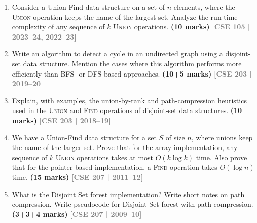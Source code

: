 \documentclass[12pt,a3paper]{article}
\newcommand{\yr}[1]{\hfill\textcolor{gray}{\small\textbf{[#1]}}}
\newcommand{\mk}[1]{\textcolor{orange!70!black}{\small\textbf{(#1 marks)}}}
\begin{document}
\begin{enumerate}

\item Consider a Union-Find data structure on a set of $n$ elements, where the \textsc{Union} operation keeps the name of the largest set. Analyze the run-time complexity of any sequence of $k$ \textsc{Union} operations. \mk{10}
\yr{CSE 105 | 2023--24, 2022--23}

\item Write an algorithm to detect a cycle in an undirected graph using a disjoint-set data structure. Mention the cases where this algorithm performs more efficiently than BFS- or DFS-based approaches. \mk{10+5}
\yr{CSE 203 | 2019--20}

\item Explain, with examples, the union-by-rank and path-compression heuristics used in the \textsc{Union} and \textsc{Find} operations of disjoint-set data structures. \mk{10}
\yr{CSE 203 | 2018--19}

\item We have a Union-Find data structure for a set $S$ of size $n$, where unions keep the name of the larger set. Prove that for the array implementation, any sequence of $k$ \textsc{Union} operations takes at most $O(k \log k)$ time. Also prove that for the pointer-based implementation, a \textsc{Find} operation takes $O(\log n)$ time. \mk{15}
\yr{CSE 207 | 2011--12}

\item What is the Disjoint Set forest implementation? Write short notes on path compression. Write pseudocode for Disjoint Set forest with path compression. \mk{3+3+4}
\yr{CSE 207 | 2009--10}

\end{enumerate}
\newpage
\end{document}
